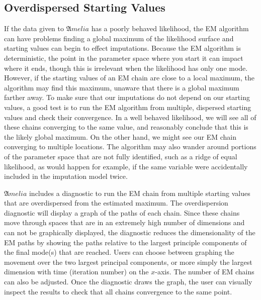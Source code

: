 \documentclass[12pt,titlepage]{article}
\newcommand{\Amelia}{\ensuremath{\mathfrak Amelia} }
\begin{document}
\subsection{Overdispersed Starting Values}
\label{sec:overdisperse}
If the data given to \Amelia has a poorly behaved likelihood, the EM algorithm can have problems finding a global maximum of the likelihood surface and starting values can begin to effect imputations.  Because the EM algorithm is deterministic, the point in the parameter space where you start it can impact where it ends, though this is irrelevant when the likelihood has only one mode.  However, if the starting values of an EM chain are close to a local maximum, the algorithm may find this maximum, unaware that there is a global maximum farther away.  To make sure that our imputations do not depend on our starting values, a good test is to run the EM algorithm from multiple, dispersed starting values and check their convergence.  In a well behaved likelihood, we will see all of these chains converging to the same value, and reasonably conclude that this is the likely global maximum.  On the other hand, we might see our EM chain converging to multiple locations.  The algorithm may also wander around portions of the parameter space that are not fully identified, such as a ridge of equal likelihood, as would happen for example, if the same variable were accidentally included in the imputation model twice.

\Amelia includes a diagnostic to run the EM chain from multiple starting values that are overdispersed from the estimated maximum.  The overdispersion diagnostic will display a graph of the paths of each chain.  Since these chains move through spaces that are in an extremely high number of dimensions and can not be graphically displayed, the diagnostic reduces the dimensionality of the EM paths by showing the paths relative to the largest principle components of the final mode(s) that are reached.  Users can choose between graphing the movement over the two largest principal components, or more simply the largest dimension with time (iteration number) on the $x$-axis.  The number of EM chains can also be adjusted.  Once the diagnostic draws the graph, the user can visually inspect the results to check that all chains convergence to the same point.
\end{document}
